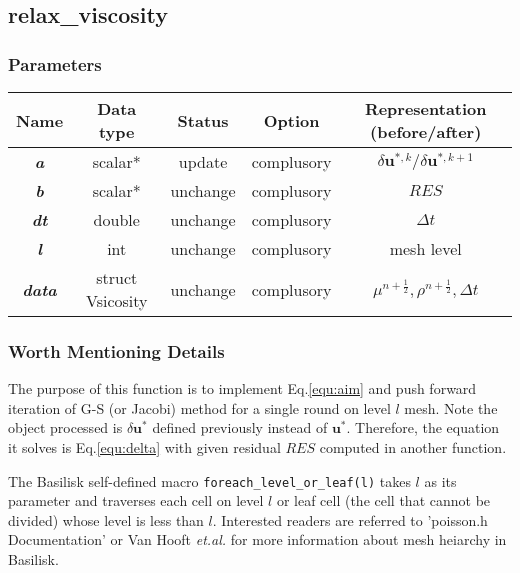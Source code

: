 \documentclass[a4paper]{article}
\newcommand{\func}[1]{\textbf{\textcolor{function}{#1}}}
\newcommand{\para}[1]{\textbf{\emph{\textcolor{para}{#1}}}}
\begin{document}
\subsection{\func{relax\_viscosity}}

\subsubsection{Parameters}
\begin{center}
  \begin{tabular}{|c|c|c|c|c|}
    \hline
    Name & Data type & Status & Option & Representation (before/after)\\[0.5ex]
    \hline\hline
    \rowcolor{output} \para{a} & scalar* & update & complusory & $\delta \mathbf{u}^{*,k}/\delta \mathbf{u}^{*,k+1}$\\
    \hline
    \para{b} & scalar* & unchange & complusory & $RES$\\
    \hline
    \para{dt} & double & unchange & complusory & $\Delta t$\\
    \hline
    \para{l} & int & unchange & complusory &  mesh level \\
    \hline
    \para{data} & struct Vsicosity & unchange & complusory & $\mu^ {n+\frac{1}{2}}, \rho^{n+\frac{1}{2}}, \Delta t$ \\
    \hline
  \end{tabular}
\end{center}

\subsubsection{Worth Mentioning Details}
The purpose of this function is to implement Eq.\ref{equ:aim} and push forward iteration of G-S (or Jacobi) method for a single round on level $l$ mesh. Note the object processed is $\delta \mathbf{u}^{*}$ defined previously instead of $ \mathbf{u}^{*}$. Therefore, the equation it solves is Eq.\ref{equ:delta} with given residual $RES$ computed in another function.\par 
The Basilisk self-defined macro \texttt{foreach_level_or_leaf(l)} takes $l$ as its parameter and traverses each cell on level $l$ or leaf cell (the cell that cannot be divided) whose level is less than $l$. Interested readers are referred to 'poisson.h Documentation' or Van Hooft \emph{et.al.}\cite{van2018towards} for more information about mesh heiarchy in Basilisk. 
\end{document}
